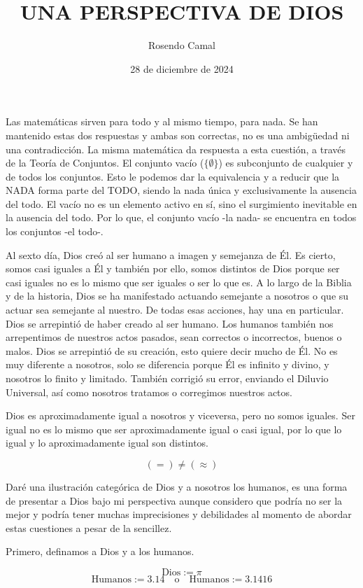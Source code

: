 \documentclass[letterpaper,12pt]{article}
\title{UNA PERSPECTIVA DE DIOS}
\author{Rosendo Camal}
\date{28 de diciembre de 2024}
\begin{document}
\maketitle

Las matemáticas sirven para todo y al mismo tiempo, para nada. Se han mantenido estas dos respuestas y ambas son correctas, no es una ambigüedad ni una contradicción. La misma matemática da respuesta a esta cuestión, a través de la Teoría de Conjuntos. El conjunto vacío (\(\{\emptyset\}\)) es subconjunto de cualquier y de todos los conjuntos. Esto le podemos dar la equivalencia y a reducir que la NADA forma parte del TODO, siendo la nada única y exclusivamente la ausencia del todo. El vacío no es un elemento activo en sí, sino el surgimiento inevitable en la ausencia del todo. Por lo que, el conjunto vacío -la nada- se encuentra en todos los conjuntos -el todo-.

Al sexto día, Dios creó al ser humano a imagen y semejanza de Él. Es cierto, somos casi iguales a Él y también por ello, somos distintos de Dios porque ser casi iguales no es lo mismo que ser iguales o ser lo que es. A lo largo de la Biblia y de la historia, Dios se ha manifestado actuando semejante a nosotros o que su actuar sea semejante al nuestro. De todas esas acciones, hay una en particular. Dios se arrepintió de haber creado al ser humano. Los humanos también nos arrepentimos de nuestros actos pasados, sean correctos o incorrectos, buenos o malos. Dios se arrepintió de su creación, esto quiere decir mucho de Él. No es muy diferente a nosotros, solo se diferencia porque Él es infinito y divino, y nosotros lo finito y limitado. También corrigió su error, enviando el Diluvio Universal, así como nosotros tratamos o corregimos nuestros actos.

Dios es aproximadamente igual a nosotros y viceversa, pero no somos iguales. Ser igual no es lo mismo que ser aproximadamente igual o casi igual, por lo que lo igual y lo aproximadamente igual son distintos.

\[
(=) \neq (\approx)
\]

Daré una ilustración categórica de Dios y a nosotros los humanos, es una forma de presentar a Dios bajo mi perspectiva aunque considero que podría no ser la mejor y podría tener muchas imprecisiones y debilidades al momento de abordar estas cuestiones a pesar de la sencillez.

Primero, definamos a Dios y a los humanos.

\[
\text{Dios} := \pi
\]
\[
\text{Humanos} := 3.14 \quad \text{o} \quad \text{Humanos} := 3.1416
\]
\end{document}
